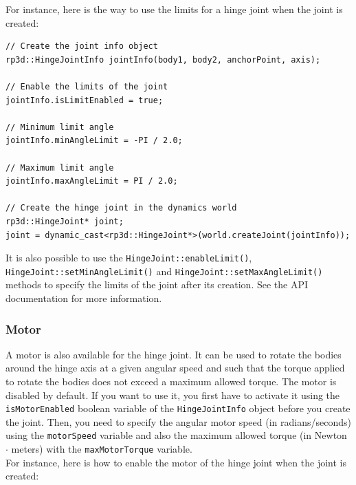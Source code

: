 \documentclass[a4paper,12pt]{article}
\begin{document}
     For instance, here is the way to use the limits for a hinge joint when the joint is created: \\

     \begin{lstlisting}
// Create the joint info object
rp3d::HingeJointInfo jointInfo(body1, body2, anchorPoint, axis);

// Enable the limits of the joint
jointInfo.isLimitEnabled = true;

// Minimum limit angle
jointInfo.minAngleLimit = -PI / 2.0;

// Maximum limit angle
jointInfo.maxAngleLimit = PI / 2.0;

// Create the hinge joint in the dynamics world
rp3d::HingeJoint* joint;
joint = dynamic_cast<rp3d::HingeJoint*>(world.createJoint(jointInfo));
  \end{lstlisting}

     \vspace{0.6cm}

     \begin{sloppypar}
        It is also possible to use the \texttt{HingeJoint::enableLimit()}, \texttt{HingeJoint::setMinAngleLimit()} and \texttt{HingeJoint::setMaxAngleLimit()} methods to specify
        the limits of the joint after its creation. See the API documentation for more information.
     \end{sloppypar}

     \subsubsection{Motor}

     A motor is also available for the hinge joint. It can be used to rotate the bodies around the hinge axis at a given angular speed and such that the torque applied to
     rotate the bodies does not exceed a maximum allowed torque. The motor is disabled by default. If you want to use it, you first have to activate it using the
     \texttt{isMotorEnabled} boolean variable of the \texttt{HingeJointInfo} object before you create the joint. Then, you need to specify the angular motor speed (in radians/seconds)
     using the \texttt{motorSpeed} variable and also the maximum allowed torque (in Newton $\cdot$ meters) with the \texttt{maxMotorTorque} variable. \\

     For instance, here is how to enable the motor of the hinge joint when the joint is created: \\
\end{document}
